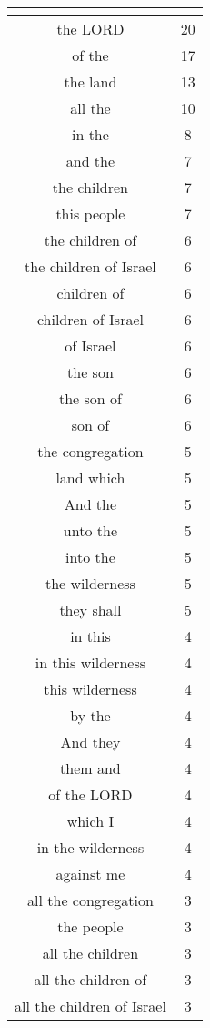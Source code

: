 \begin{center}
\begin{longtable}{|c|c|}
\hline \multicolumn{2}{c}{{ }} \\ \hline
\endfoot 
the LORD & 20\\ \hline 
of the & 17\\ \hline 
the land & 13\\ \hline 
all the & 10\\ \hline 
in the & 8\\ \hline 
and the & 7\\ \hline 
the children & 7\\ \hline 
this people & 7\\ \hline 
the children of & 6\\ \hline 
the children of Israel & 6\\ \hline 
children of & 6\\ \hline 
children of Israel & 6\\ \hline 
of Israel & 6\\ \hline 
the son & 6\\ \hline 
the son of & 6\\ \hline 
son of & 6\\ \hline 
the congregation & 5\\ \hline 
land which & 5\\ \hline 
And the & 5\\ \hline 
unto the & 5\\ \hline 
into the & 5\\ \hline 
the wilderness & 5\\ \hline 
they shall & 5\\ \hline 
in this & 4\\ \hline 
in this wilderness & 4\\ \hline 
this wilderness & 4\\ \hline 
by the & 4\\ \hline 
And they & 4\\ \hline 
them and & 4\\ \hline 
of the LORD & 4\\ \hline 
which I & 4\\ \hline 
in the wilderness & 4\\ \hline 
against me & 4\\ \hline 
all the congregation & 3\\ \hline 
the people & 3\\ \hline 
all the children & 3\\ \hline 
all the children of & 3\\ \hline 
all the children of Israel & 3\\ \hline 

\end{longtable}
\end{center}
